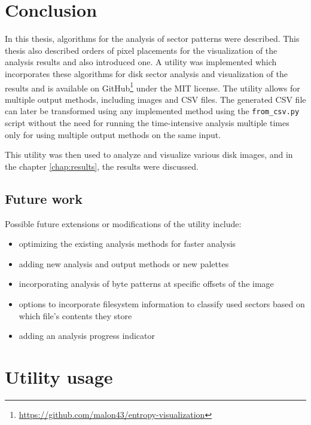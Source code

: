 \documentclass[
  digital, %
  color,   %
  oneside, %
  lof,     %
  nolot,     %
]{fithesis4}
\begin{document}
\chapter{Conclusion}
\label{chap:conclusion}

In this thesis, algorithms for the analysis of sector patterns were described.
This thesis also described orders of pixel placements for the visualization of the analysis results and also introduced one.
A utility was implemented which incorporates these algorithms for disk sector analysis and visualization of the results and is available on GitHub\footnote{\url{https://github.com/malon43/entropy-visualization}} under the MIT license.
The utility allows for multiple output methods, including images and CSV files.
The generated CSV file can later be transformed using any implemented method using the \texttt{from\_csv.py} script without the need for running the time-intensive analysis multiple times only for using multiple output methods on the same input. 

This utility was then used to analyze and visualize various disk images, and in the chapter \ref{chap:results}, the results were discussed.

\section{Future work}
\label{sec:future-work}

Possible future extensions or modifications of the utility include:
\begin{itemize}
  \item optimizing the existing analysis methods for faster analysis
  \item adding new analysis and output methods or new palettes
  \item incorporating analysis of byte patterns at specific offsets of the image
  \item options to incorporate filesystem information to classify used sectors based on which file's contents they store
  \item adding an analysis progress indicator
\end{itemize}

\makeatletter\thesis@blocks@clear\makeatother
\sloppy
\printbibliography

\appendix %
\chapter{Utility usage}
\label{chap:utility-usage}
\end{document}
